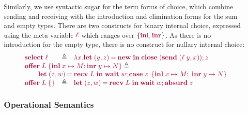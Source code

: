 \documentclass[main.tex]{subfiles}
\begin{document}
Similarly, we use syntactic sugar for the term forms of choice, which combine sending and receiving with the introduction and elimination forms for the sum and empty types. There are two constructs for binary internal choice, expressed using the meta-variable $\tm{\ell}$ which ranges over $\{\tm{\labinl},\tm{\labinr}\}$. As there is no introduction for the empty type, there is no construct for nullary internal choice:
\[
\begin{array}{lcl}
  \tm{\select{\ell}}
  & \elabarrow & \tm{\lambda x.\letpair{y}{z}{\new}{\andthen{\close\;(\send\;{\pair{\ell\;y}{x}})}{z}}} \\
  \multicolumn{3}{l}{\tm{\offer{L}{x}{M}{y}{N}}\elabarrow} \\
  \multicolumn{3}{l}{
  \qquad\tm{\letpair{z}{w}{\recv\;{L}}{\andthen{\wait\;{w}}{\casesum{z}{x}{M}{y}{N}}}}} \\
  \tm{\offeremp{L}}
  & \elabarrow & \tm{\letpair{z}{w}{\recv\;L}{\andthen{\wait\;{w}}{\absurd{z}}}}
\end{array}
\]

\subsubsection*{Operational Semantics}
\end{document}
